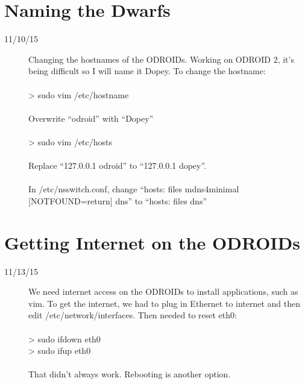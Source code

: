 \section{Naming the Dwarfs}
\begin{description}
\item[11/10/15] Changing the hostnames of the ODROIDs. Working on ODROID 2, it's being difficult so I will name it Dopey. To change the hostname: \\ \\
> sudo vim /etc/hostname \\ \\
Overwrite ``odroid'' with ``Dopey'' \\ \\
> sudo vim /etc/hosts \\ \\
Replace ``127.0.0.1 odroid'' to ``127.0.0.1 dopey''. \\ \\
In /etc/nsswitch.conf, change ``hosts: files mdns4\textunderscore minimal [NOTFOUND=return] dns'' to ``hosts: files dns''
\end{description}

\section{Getting Internet on the ODROIDs}
\begin{description}
\item [11/13/15] We need internet access on the ODROIDs to install applications, such as vim. To get the internet, we had to plug in Ethernet to internet and then edit /etc/network/interfaces. Then needed to reset eth0: \\ \\
> sudo ifdown eth0 \\
> sudo ifup eth0 \\ \\
That didn't always work. Rebooting is another option.
\end{description}

